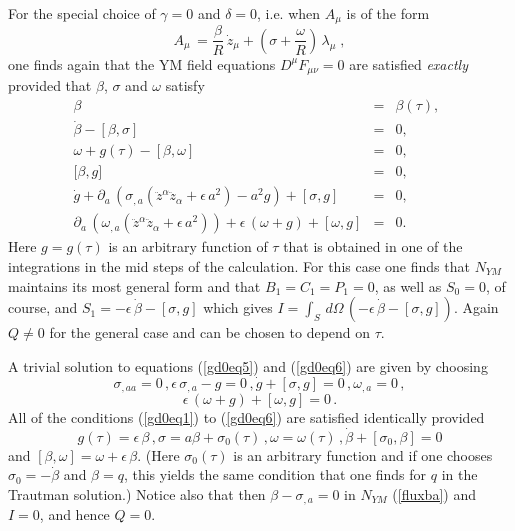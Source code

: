 \documentclass[a4paper,twocolumn,prd,showpacs,amsmath,amssymb]{revtex4}
\begin{document}
For the special choice of $\gamma=0$ and $\delta=0$, i.e. when
$A_{\mu}$ is of the form
\begin{equation}
A_{\mu} \, = \frac{\beta}{R} \, \dot{z}_{\mu}
+ (\sigma + \frac{\omega}{R} ) \, \lambda_{\mu} \; ,
\label{solsecc}
\end{equation}
one finds again that the YM field equations $D^{\mu} F_{\mu\nu}=0$ are
satisfied {\it exactly} provided that $\beta$, $\sigma$ and $\omega$ satisfy
\begin{eqnarray}
\beta & = & \beta(\tau) , ~~\label{gd0eq1} \\
\dot{\beta} - [\beta,\sigma] & = & 0 , ~~\label{gd0eq2} \\
\omega + g(\tau) - [\beta,\omega] & = & 0 , ~~\label{gd0eq3} \\
\lbrack \beta,g \rbrack & = & 0 , ~~\label{gd0eq4} \\
\dot{g} + \partial_{a} \, (\sigma_{,a} (\ddot{z}^{\alpha} \ddot{z}_{\alpha}
+ \epsilon \, a^2) - a^2 g) + [\sigma,g] & = & 0 , ~~\label{gd0eq5} \\
\partial_{a} \, (\omega_{,a} (\ddot{z}^{\alpha} \ddot{z}_{\alpha} + \epsilon \, a^2))
+ \epsilon \, (\omega + g) + [\omega,g] & = & 0 . ~~\label{gd0eq6}
\end{eqnarray}
Here $g=g(\tau)$ is an arbitrary function of $\tau$ that is obtained in one
of the integrations in the mid steps of the calculation. For this case one finds that $N_{YM}$
maintains its most general form and that $B_{1}=C_{1}=P_{1}=0$, as well as
$S_{0}=0$, of course, and $S_{1}= - \epsilon \, \dot{\beta} - [\sigma,g]$
which gives \( I = \int_{S} \, d\Omega \, (- \epsilon \, \dot{\beta} - [\sigma,g]) \).
Again $Q \neq 0$ for the general case and can be chosen to depend on $\tau$.

A trivial solution to equations (\ref{gd0eq5}) and (\ref{gd0eq6}) are given by choosing
\[ \sigma_{,aa}=0 \, ,
\epsilon \, \sigma_{,a} - g =0 \, , \dot{g} + [\sigma,g] =0 \, , \omega_{,a} =0 \, , \]
\[ \epsilon \, (\omega + g) + [\omega,g] =0 \, . \]
All of the conditions (\ref{gd0eq1}) to (\ref{gd0eq6}) are satisfied identically provided
\[ g(\tau) = \epsilon \, \beta \, , \sigma = a \beta + \sigma_{0}(\tau) \, ,
\omega = \omega(\tau) \, , \dot{\beta} + [\sigma_{0},\beta] =0 \]
and $[\beta,\omega]=\omega + \epsilon \, \beta$. (Here $\sigma_{0}(\tau)$ is
an arbitrary function and if one chooses $\sigma_{0} = - \dot{\beta}$ and
$\beta=q$, this yields the same condition that one finds for $q$ in the
Trautman solution.) Notice also that then $\beta - \sigma_{,a} = 0$ in $N_{YM}$
(\ref{fluxba}) and $I=0$, and hence $Q=0$.
\end{document}

